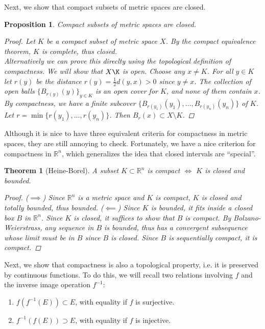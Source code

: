 \documentclass[10pt]{article}         %
\newtheorem{theorem}{Theorem}[section]
\newtheorem{proposition}{Proposition}[section]
\theoremstyle{remark}
\newcommand{\R}{\mathbb{R}}
\begin{document}
Next, we show that compact subsets of metric spaces are closed.

\begin{proposition}
Compact subsets of metric spaces are closed.
\begin{proof}
Let $K$ be a compact subset of metric space $X$. By the compact equivalence theorem, $K$ is complete, thus closed.\\
Alternatively we can prove this direclty using the topological definition of compactness. We will show that $X\K$ is open. Choose any $x \neq K$. For all $y \in K$ let $r(y)$ be the distance $r(y) = \frac{1}{2}d(y, x) > 0$ since $y \neq x$. The collection of open balls $\{ B_{r(y)}(y) \}_{y \in K}$ is an open cover for $K$, and none of them contain $x$. By compactness, we have a finite subcover $\{ B_{r(y_1)}(y_1), \dots, B_{r(y_n)}(y_n)\}$ of $K$. Let $r = \min\{ r(y_1), \dots, r(y_n) \}$. Then $B_r(x) \subset X\setminus K$.
\end{proof}
\end{proposition}

Although it is nice to have three equivalent criteria for compactness in metric spaces, they are still annoying to check. Fortunately, we have a nice criterion for compactness in $\R^n$, which generalizes the idea that closed intervals are ``special''.

\begin{theorem}[Heine-Borel]
 A subset $K \subset \R^n$ is compact $\iff$ $K$ is closed and bounded.
\begin{proof}
($\implies$) Since $\R^n$ is a metric space and $K$ is compact, $K$ is closed and totally bounded, thus bounded.
($\impliedby$) Since $K$ is bounded, it fits inside a closed box $B$ in $\R^n$. Since $K$ is closed, it suffices to show that $B$ is compact. By Bolzano-Weierstrass, any sequence in $B$ is bounded, thus has a convergent subsequence whose limit must be in $B$ since $B$ is closed. Since $B$ is sequentially compact, it is compact.
\end{proof}
\end{theorem}

Next, we show that compactness is also a topological property, i.e. it is preserved by continuous functions. To do this, we will recall two relations involving $f$ and the inverse image operation $f^{-1}$:
\begin{enumerate}
    \item $f(f^{-1}(E)) \subset E$, with equality if $f$ is surjective.
    \item $f^{-1}(f(E)) \supset E$, with equality if $f$ is injective.
\end{enumerate}
\end{document}
